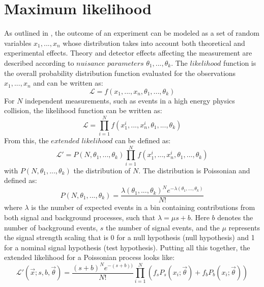 \section{Maximum likelihood}
\noindent\justify
As outlined in \cite{Lista:2016chp}, the outcome of an experiment can be modeled as a set of random variables $x_{1}, ..., x_{n}$ whose distribution takes into account both theoretical and experimental effects. 
Theory and detector effects affecting the measurement are described according to $nuisance$ $parameters$ $\theta_{1}, ..., \theta_{k}$.
The $likelihood$ function is the overall probability distribution function evaluated for the observations $x_{1}, ..., x_{n}$ and can be written as:
\begin{equation}
\mathcal{L}=f(x_{1}, ..., x_{n}, \theta_{1}, ..., \theta_{k})
\end{equation}
For $N$ independent measurements, such as events in a high energy physics collision, the likelihood function can be written as: 
\begin{equation}
\mathcal{L}=\prod_{i=1}^{N}f(x_{1}^{i}, ..., x_{n}^{i}, \theta_{1}, ..., \theta_{k})
\end{equation}
From this, the $extended$ $likelihood$ can be defined as:
\begin{equation}
\mathcal{L'}=P(N, \theta_{1}, ..., \theta_{k})\prod_{i=1}^{N}f(x_{1}^{i}, ..., x_{n}^{i}, \theta_{1}, ..., \theta_{k})
\end{equation}
with $P(N, \theta_{1}, ..., \theta_{k})$ the distribution of $N$. 
The distribution is Poissonian and defined as:
\begin{equation}
P(N,\theta_{1}, ..., \theta_{k})=\frac{\lambda(\theta_{1}, ..., \theta_{k})^{N}e^{-\lambda(\theta_{1}, ..., \theta_{k})}}{N!}
\end{equation}
where $\lambda$ is the number of expected events in a bin containing contributions from both signal and background processes, such that $\lambda=\mu s+b$.  
Here $b$ denotes the number of background events, $s$ the number of signal events, and the $\mu$ represents the signal strength scaling that is 0 for a null hypothesis (null hypothesis) and 1 for a nominal signal hypothesis (test hypothesis). 
Putting all this together, the extended likelihood for a Poissonian process looks like:
\begin{equation}
\mathcal{L'}(\vec{x}; s, b, \vec{\theta})=\frac{(s+b)^{N}e^{-(s+b))}}{N!}\prod_{i=1}^{N}\left( f_{s}P_{s}(x_{i}; \vec{\theta})+f_{b}P_{b}(x_{i};\vec{\theta})\right)
\label{eq:maxLikelihood}
\end{equation}
